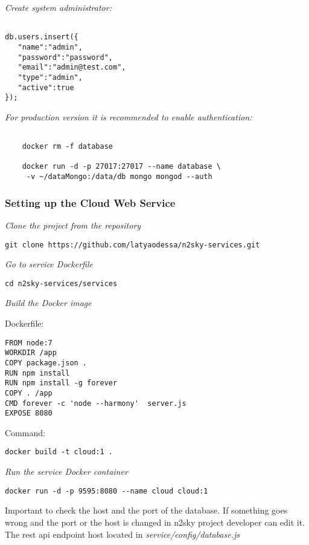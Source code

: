 \emph{Create system administrator:}
 \begin{lstlisting}
 
db.users.insert({
   "name":"admin",
   "password":"password",
   "email":"admin@test.com",
   "type":"admin",
   "active":true
});

\end{lstlisting}


\emph{For production version it is recommended to enable authentication:}
 \begin{lstlisting}
 
 	docker rm -f database
 
	docker run -d -p 27017:27017 --name database \
	 -v ~/dataMongo:/data/db mongo mongod --auth

\end{lstlisting}



\subsubsection{Setting up the Cloud Web Service}\label{cloud setup}

\emph{Clone the project from the repository}
 \begin{lstlisting}
git clone https://github.com/latyaodessa/n2sky-services.git 
\end{lstlisting}

\emph{Go to service Dockerfile}
 \begin{lstlisting}
cd n2sky-services/services
\end{lstlisting}

\emph{Build the Docker image}

Dockerfile:
 \begin{lstlisting}
FROM node:7
WORKDIR /app
COPY package.json .
RUN npm install
RUN npm install -g forever
COPY . /app
CMD forever -c 'node --harmony'  server.js
EXPOSE 8080
\end{lstlisting}

Command: 
 \begin{lstlisting}
docker build -t cloud:1 .
\end{lstlisting}


\emph{Run the service Docker container}
 \begin{lstlisting}
docker run -d -p 9595:8080 --name cloud cloud:1
\end{lstlisting}


Important to check the host and the port of the database. 
If something goes wrong and the port or the host is changed in n2sky project developer can edit it.
The rest api endpoint host located in \emph{service/config/database.js}

